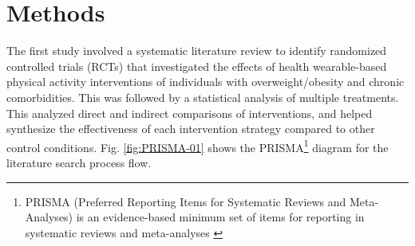 \section{Methods}
The first study involved a systematic literature review to identify randomized controlled trials (RCTs) that investigated the effects of health wearable-based physical activity interventions of individuals with overweight/obesity and chronic comorbidities. This was followed by a statistical analysis of multiple treatments. This analyzed direct and indirect comparisons of interventions, and helped synthesize the effectiveness of each intervention strategy compared to other control conditions. Fig. \ref{fig:PRISMA-01} shows the PRISMA\footnote{\label{foot:PRISMA}PRISMA (Preferred Reporting Items for Systematic Reviews and Meta-Analyses) is an evidence-based minimum set of items for reporting in systematic reviews and meta-analyses \cite{ref06}} diagram for the literature search process flow.
